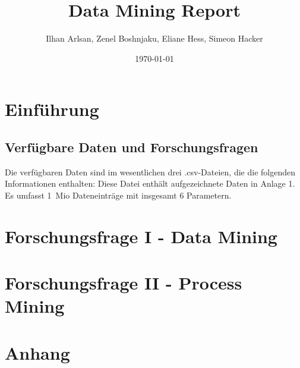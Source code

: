 \documentclass[a4paper,12pt]{article}
\title{Data Mining Report}
\author{Ilhan Arlsan, Zenel Boshnjaku, Eliane Hess, Simeon Hacker}
\date{\today}
\begin{document}
\maketitle
\tableofcontents
\newpage

\section{Einführung}
\label{sec:Einführung}

\subsection{Verfügbare Daten und Forschungsfragen}
\label{subsec:Verfügbare Daten und Forschungsfragen}

Die verfügbaren Daten sind im wesentlichen drei .csv-Dateien, die die folgenden Informationen enthalten:
Diese Datei enthält aufgezeichnete Daten in Anlage 1. Es umfasst 1~Mio Dateneinträge mit insgesamt 6 Parametern.



\section{Forschungsfrage I - Data Mining}
\label{sec:FI}

\section{Forschungsfrage II - Process Mining}
\label{sec:FII}

\appendix
\section{Anhang}
\label{sec:anhang}



\end{document}
